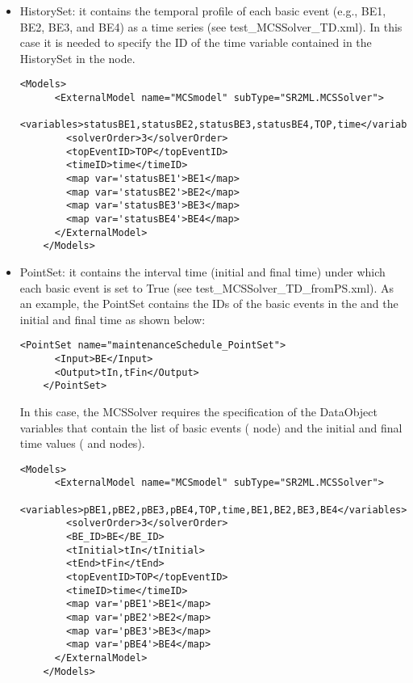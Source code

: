 \begin{itemize}
  \item HistorySet: it contains the temporal profile of each basic event (e.g., BE1, BE2, BE3, and BE4) as a time 
                    series (see test\_MCSSolver\_TD.xml). In this case it is needed to specify the ID of the time variable 
                    contained in the HistorySet in the  node.
  
   \begin{lstlisting}[style=XML,morekeywords={anAttribute},caption=Time dependent (from HistorySet) MCSSolver model input example., label=lst:MCSSolver_InputExample]
     <Models>
      <ExternalModel name="MCSmodel" subType="SR2ML.MCSSolver">
        <variables>statusBE1,statusBE2,statusBE3,statusBE4,TOP,time</variables>
        <solverOrder>3</solverOrder>
        <topEventID>TOP</topEventID>
        <timeID>time</timeID>
        <map var='statusBE1'>BE1</map>
        <map var='statusBE2'>BE2</map>
        <map var='statusBE3'>BE3</map>
        <map var='statusBE4'>BE4</map>
      </ExternalModel>
    </Models>
  \end{lstlisting}
  
  \item PointSet: it contains the interval time (initial and final time) under which each basic event is set to 
                  True (see test\_MCSSolver\_TD\_fromPS.xml). As an example, the PointSet contains the IDs of the basic events
                  in the and the initial and final time as shown below:
                  
   \begin{lstlisting}[style=XML,morekeywords={anAttribute},caption= Example of PointSet for time dependent MCSSolver calculation., label=lst:MCSSolver_InputExample]
    <PointSet name="maintenanceSchedule_PointSet">
      <Input>BE</Input>
      <Output>tIn,tFin</Output>
    </PointSet>
    \end{lstlisting}
    
                  In this case, the MCSSolver requires the specification of the DataObject variables that contain the list of basic events
                  ( node) and the initial and final time values ( and  nodes).
                  
   \begin{lstlisting}[style=XML,morekeywords={anAttribute},caption=Time dependent (from PointSet) MCSSolver model input example., label=lst:MCSSolver_InputExample]
    <Models>
      <ExternalModel name="MCSmodel" subType="SR2ML.MCSSolver">
        <variables>pBE1,pBE2,pBE3,pBE4,TOP,time,BE1,BE2,BE3,BE4</variables>
        <solverOrder>3</solverOrder>
        <BE_ID>BE</BE_ID>
        <tInitial>tIn</tInitial>
        <tEnd>tFin</tEnd>
        <topEventID>TOP</topEventID>
        <timeID>time</timeID>
        <map var='pBE1'>BE1</map>
        <map var='pBE2'>BE2</map>
        <map var='pBE3'>BE3</map>
        <map var='pBE4'>BE4</map>
      </ExternalModel>
    </Models>
  \end{lstlisting}
\end{itemize}

